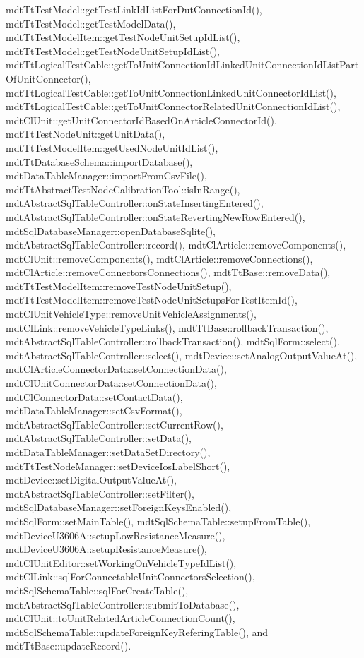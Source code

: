 mdt\-Tt\-Test\-Model\-::get\-Test\-Link\-Id\-List\-For\-Dut\-Connection\-Id(), mdt\-Tt\-Test\-Model\-::get\-Test\-Model\-Data(), mdt\-Tt\-Test\-Model\-Item\-::get\-Test\-Node\-Unit\-Setup\-Id\-List(), mdt\-Tt\-Test\-Model\-::get\-Test\-Node\-Unit\-Setup\-Id\-List(), mdt\-Tt\-Logical\-Test\-Cable\-::get\-To\-Unit\-Connection\-Id\-Linked\-Unit\-Connection\-Id\-List\-Part\-Of\-Unit\-Connector(), mdt\-Tt\-Logical\-Test\-Cable\-::get\-To\-Unit\-Connection\-Linked\-Unit\-Connector\-Id\-List(), mdt\-Tt\-Logical\-Test\-Cable\-::get\-To\-Unit\-Connector\-Related\-Unit\-Connection\-Id\-List(), mdt\-Cl\-Unit\-::get\-Unit\-Connector\-Id\-Based\-On\-Article\-Connector\-Id(), mdt\-Tt\-Test\-Node\-Unit\-::get\-Unit\-Data(), mdt\-Tt\-Test\-Model\-Item\-::get\-Used\-Node\-Unit\-Id\-List(), mdt\-Tt\-Database\-Schema\-::import\-Database(), mdt\-Data\-Table\-Manager\-::import\-From\-Csv\-File(), mdt\-Tt\-Abstract\-Test\-Node\-Calibration\-Tool\-::is\-In\-Range(), mdt\-Abstract\-Sql\-Table\-Controller\-::on\-State\-Inserting\-Entered(), mdt\-Abstract\-Sql\-Table\-Controller\-::on\-State\-Reverting\-New\-Row\-Entered(), mdt\-Sql\-Database\-Manager\-::open\-Database\-Sqlite(), mdt\-Abstract\-Sql\-Table\-Controller\-::record(), mdt\-Cl\-Article\-::remove\-Components(), mdt\-Cl\-Unit\-::remove\-Components(), mdt\-Cl\-Article\-::remove\-Connections(), mdt\-Cl\-Article\-::remove\-Connectors\-Connections(), mdt\-Tt\-Base\-::remove\-Data(), mdt\-Tt\-Test\-Model\-Item\-::remove\-Test\-Node\-Unit\-Setup(), mdt\-Tt\-Test\-Model\-Item\-::remove\-Test\-Node\-Unit\-Setups\-For\-Test\-Item\-Id(), mdt\-Cl\-Unit\-Vehicle\-Type\-::remove\-Unit\-Vehicle\-Assignments(), mdt\-Cl\-Link\-::remove\-Vehicle\-Type\-Links(), mdt\-Tt\-Base\-::rollback\-Transaction(), mdt\-Abstract\-Sql\-Table\-Controller\-::rollback\-Transaction(), mdt\-Sql\-Form\-::select(), mdt\-Abstract\-Sql\-Table\-Controller\-::select(), mdt\-Device\-::set\-Analog\-Output\-Value\-At(), mdt\-Cl\-Article\-Connector\-Data\-::set\-Connection\-Data(), mdt\-Cl\-Unit\-Connector\-Data\-::set\-Connection\-Data(), mdt\-Cl\-Connector\-Data\-::set\-Contact\-Data(), mdt\-Data\-Table\-Manager\-::set\-Csv\-Format(), mdt\-Abstract\-Sql\-Table\-Controller\-::set\-Current\-Row(), mdt\-Abstract\-Sql\-Table\-Controller\-::set\-Data(), mdt\-Data\-Table\-Manager\-::set\-Data\-Set\-Directory(), mdt\-Tt\-Test\-Node\-Manager\-::set\-Device\-Ios\-Label\-Short(), mdt\-Device\-::set\-Digital\-Output\-Value\-At(), mdt\-Abstract\-Sql\-Table\-Controller\-::set\-Filter(), mdt\-Sql\-Database\-Manager\-::set\-Foreign\-Keys\-Enabled(), mdt\-Sql\-Form\-::set\-Main\-Table(), mdt\-Sql\-Schema\-Table\-::setup\-From\-Table(), mdt\-Device\-U3606\-A\-::setup\-Low\-Resistance\-Measure(), mdt\-Device\-U3606\-A\-::setup\-Resistance\-Measure(), mdt\-Cl\-Unit\-Editor\-::set\-Working\-On\-Vehicle\-Type\-Id\-List(), mdt\-Cl\-Link\-::sql\-For\-Connectable\-Unit\-Connectors\-Selection(), mdt\-Sql\-Schema\-Table\-::sql\-For\-Create\-Table(), mdt\-Abstract\-Sql\-Table\-Controller\-::submit\-To\-Database(), mdt\-Cl\-Unit\-::to\-Unit\-Related\-Article\-Connection\-Count(), mdt\-Sql\-Schema\-Table\-::update\-Foreign\-Key\-Refering\-Table(), and mdt\-Tt\-Base\-::update\-Record().

